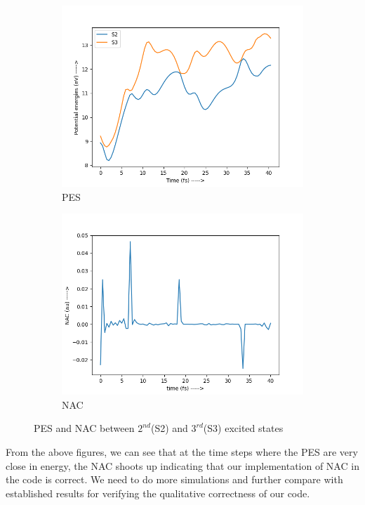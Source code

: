 \documentclass[12pt]{article}
\begin{document}
\begin{figure}[h]
\begin{subfigure}{.5\textwidth}
  \centering
  \includegraphics[width=1.0\linewidth]{PES_34.png}
  \caption{PES}
  \label{fig:sfig1}
\end{subfigure}%
\begin{subfigure}{.5\textwidth}
  \centering
  \includegraphics[width=1.0\linewidth]{nac_34.png}
  \caption{NAC}
  \label{fig:sfig2}
\end{subfigure}
\caption{PES and NAC between $2^{nd}$(S2) and $3^{rd}$(S3) excited states}
\label{fig:NAC_23}
\end{figure}
From the above figures, we can see that at the time steps where the PES are very close in energy, the NAC shoots up indicating that our implementation of NAC in the code is correct. We need to do more simulations and further compare with established results for verifying the qualitative correctness of our code.
\end{document}
